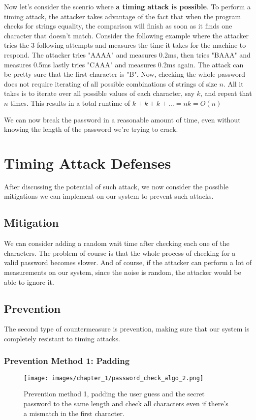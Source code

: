 Now let's consider the scenrio where \textbf{a timing attack is possible}. To
perform a timing attack, the attacker takes advantage of the fact that when the
program checks for strings equality, the comparison will finish as soon as it
finds one character that doesn't match. Consider the following example where the
attacker tries the 3 following attempts and measures the time it takes for the
machine to respond. The attacker tries "AAAA" and measures 0.2ms, then tries
"BAAA" and measures 0.5ms lastly tries "CAAA" and measures 0.2ms again. The
attack can be pretty sure that the first character is "B". Now, checking the
whole password does not require iterating of all possible combinations of
strings of size $n$. All it takes is to iterate over all possible values of each
character, say $k$, and repeat that $n$ times. This results in a total runtime
of $k+k+k+\dots = nk = O(n)$

We can now break the password in a reasonable amount of time, even without
knowing the length of the password we're trying to crack.

\section{Timing Attack Defenses}
After discussing the potential of such attack, we now consider the possible
mitigations we can implement on our system to prevent such attacks.

\subsection{Mitigation}
We can consider adding a random wait time after checking each one of the
characters. The problem of course is that the whole process of checking for a valid
password becomes slower. And of course, if the attacker can perform a lot of
measurements on our system, since the noise is random, the attacker would be
able to ignore it.


\subsection{Prevention}
The second type of countermeasure is prevention, making sure that our system is
completely resistant to timing attacks.

\subsubsection{Prevention Method 1: Padding}
\begin{figure}[H]
    \centering
    \texttt{[image: images/chapter\_1/password\_check\_algo\_2.png]}
    \caption
    {Prevention method 1, padding the user guess and the secret password to the
    same length and check all characters even if there's a mismatch in the first
    character.}
    \label{c1_fig_pass_check_2}
\end{figure}

